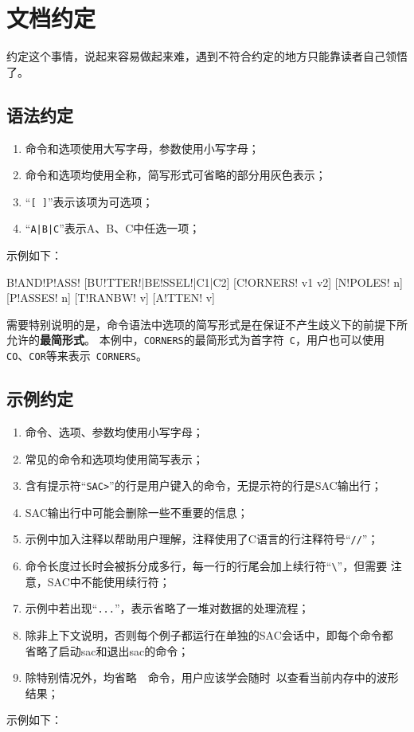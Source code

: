 \section{文档约定}
约定这个事情，说起来容易做起来难，遇到不符合约定的地方只能靠读者自己领悟了。

\subsection*{语法约定}
\begin{enumerate}
\item 命令和选项使用大写字母，参数使用小写字母；
\item 命令和选项均使用全称，简写形式可省略的部分用灰色表示；
\item ``\verb+[ ]+''表示该项为可选项；
\item ``\verb+A|B|C+''表示A、B、C中任选一项；
\end{enumerate}

示例如下：
\begin{SACSTX}
B!AND!P!ASS! [BU!TTER!|BE!SSEL!|C1|C2] [C!ORNERS! v1 v2] [N!POLES! n] [P!ASSES! n]
    [T!RANBW! v] [A!TTEN! v]
\end{SACSTX}

需要特别说明的是，命令语法中选项的简写形式是在保证不产生歧义下的前提下所允许的\textbf{最简形式}。
本例中，\verb+CORNERS+的最简形式为首字符~\verb+C+，用户也可以使用
\verb+CO+、\verb+COR+等来表示~\verb+CORNERS+。

\subsection*{示例约定}
\begin{enumerate}
\item 命令、选项、参数均使用小写字母；
\item 常见的命令和选项均使用简写表示；
\item 含有提示符``\verb+SAC>+''的行是用户键入的命令，无提示符的行是SAC输出行；
\item SAC输出行中可能会删除一些不重要的信息；
\item 示例中加入注释以帮助用户理解，注释使用了C语言的行注释符号``\verb+//+''；
\item 命令长度过长时会被拆分成多行，每一行的行尾会加上续行符``\verb+\+''，但需要
    注意，SAC中不能使用续行符；
\item 示例中若出现``\verb+...+''，表示省略了一堆对数据的处理流程；
\item 除非上下文说明，否则每个例子都运行在单独的SAC会话中，即每个命令都
    省略了启动sac和退出sac的命令；
\item 除特别情况外，均省略~~命令，用户应该学会随时~以查看当前内存中的波形结果；
\end{enumerate}

示例如下：

